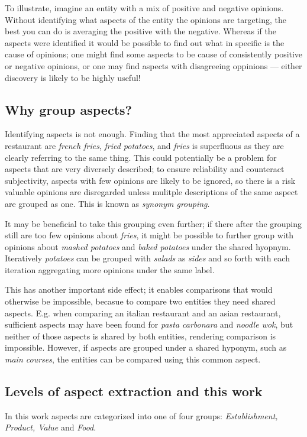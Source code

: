 \documentclass[a4paper,11pt]{kth-mag}
\begin{document}
To illustrate, imagine an entity with a mix of positive and negative opinions.
Without identifying what aspects of the entity the opinions are targeting, the best
you can do is averaging the positive with the negative.
Whereas if the aspects were identified 
it would be possible to find out what in specific is the cause of opinions;
one might find some aspects to be cause of consistently positive or negative opinions,
or one may find aspects with disagreeing oppinions
--- either discovery is likely to be highly useful!

\subsection{Why group aspects?}
Identifying aspects is not enough. Finding that the
most appreciated aspects of a restaurant are \emph{french fries},
\emph{fried potatoes}, and \emph{fries} is superfluous as they are
clearly referring to the same thing.
This could potentially be a problem for aspects that are very diversely described;
to ensure reliability and counteract subjectivity, aspects with few opinions are
likely to be ignored, so there is a risk valuable opinions are disregarded unless
mulitple descriptions of the same aspect are grouped as one. This is known as \emph{synonym grouping}.


It may be beneficial to take this grouping even further;
if there after the grouping still are too few opinions about \emph{fries},
it might be possible to further group with opinions about \emph{mashed potatoes}
and \emph{baked potatoes} under the shared hyopnym. Iteratively \emph{potatoes} can
be grouped with \emph{salads} as \emph{sides} and so forth with each iteration aggregating
more opinions under the same label.

This has another important side effect; it enables comparisons that would otherwise
be impossible, becasue to compare two entities they need shared aspects.
E.g. when comparing an italian restaurant and an asian restaurant, sufficient aspects may
have been found for \emph{pasta carbonara} and \emph{noodle wok}, but neither of
those aspects is shared by both entities, rendering comparison is impossible.
However, if aspects are grouped under a shared hyponym, such as \emph{main courses},
the entities can be compared using this common aspect.


\subsection{Levels of aspect extraction and this work}
In this work aspects are categorized into one of four groups:
\emph{Establishment, Product, Value} and \emph{Food}.
\end{document}
